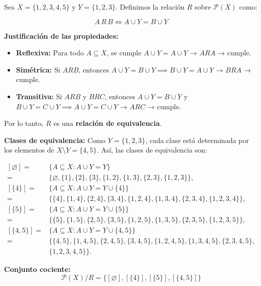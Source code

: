 \documentclass[a4paper,12pt]{article}
\begin{document}
\begin{ejemplo}[title=Ejemplo 2: Relación con fórmula]
Sea \(X = \{1,2,3,4,5\}\) y \(Y = \{1,2,3\}\).  
Definimos la relación \(R\) sobre \(\mathcal{P}(X)\) como:

\[
A \, R \, B \iff A \cup Y = B \cup Y
\]

\textbf{Justificación de las propiedades:}

\begin{itemize}
    \item \textbf{Reflexiva:} Para todo \(A \subseteq X\), se cumple \(A \cup Y = A \cup Y\) → \(A R A\) → cumple.
    
    \item \textbf{Simétrica:} Si \(A R B\), entonces \(A \cup Y = B \cup Y \implies B \cup Y = A \cup Y\) → \(B R A\) → cumple.
    
    \item \textbf{Transitiva:} Si \(A R B\) y \(B R C\), entonces \(A \cup Y = B \cup Y\) y \(B \cup Y = C \cup Y \implies A \cup Y = C \cup Y\) → \(A R C\) → cumple.
\end{itemize}

Por lo tanto, \(R\) es una \textbf{relación de equivalencia}.

\vspace{0.5em}

\textbf{Clases de equivalencia:}  
Como \(Y = \{1,2,3\}\), cada clase está determinada por los elementos de \(X \setminus Y = \{4,5\}\).  
Así, las clases de equivalencia son:

\[
\begin{aligned}
[\varnothing] = &\{A \subseteq X : A \cup Y = Y\} \\
= &\{ \varnothing, \{1\}, \{2\}, \{3\}, \{1,2\}, \{1,3\}, \{2,3\}, \{1,2,3\} \}, \\
[\{4\}] = &\{A \subseteq X : A \cup Y = Y \cup \{4\}\} \\
= &\{ \{4\}, \{1,4\}, \{2,4\}, \{3,4\}, \{1,2,4\}, \{1,3,4\}, \{2,3,4\}, \{1,2,3,4\} \}, \\
[\{5\}] = &\{A \subseteq X : A \cup Y = Y \cup \{5\}\} \\
= &\{ \{5\}, \{1,5\}, \{2,5\}, \{3,5\}, \{1,2,5\}, \{1,3,5\}, \{2,3,5\}, \{1,2,3,5\} \}, \\
[\{4,5\}] = &\{A \subseteq X : A \cup Y = Y \cup \{4,5\}\} \\
= &\{ \{4,5\}, \{1,4,5\}, \{2,4,5\}, \{3,4,5\}, \{1,2,4,5\}, \{1,3,4,5\}, \{2,3,4,5\}, \\
&\{1,2,3,4,5\} \}.
\end{aligned}
\]

\textbf{Conjunto cociente:}  
\[
\mathcal{P}(X)/R = \{ [\varnothing], [\{4\}], [\{5\}], [\{4,5\}] \}
\]
\end{ejemplo}
\end{document}
